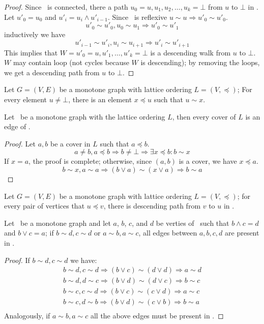 \begin{proof}
Since \mG\ is connected, there a path \(u_0=u,u_1,u_2,\dotsc,u_k=\bot\) from \(u\) to 
\(\bot\) in \mG\@. Let \(u'_0=u_0\) and \(u'_i = u_i\wedge u'_{i-1}\)\@.
Since \mG\ is reflexive \(u\sim u \Rightarrow u'_0\sim u'_0\)\@.
\[u'_0\sim u'_0, u_0\sim u_1 \Rightarrow u'_0\sim u'_1\]
inductively we have
\[u'_{i-1}\sim u'_i, u_i\sim u_{i+1} \Rightarrow u'_i\sim u'_{i+1} \]
This implies that \(W=u'_0=u,u'_1,\dotsc,u'_k=\bot\) is a descending walk from 
\(u\) to \(\bot\)\@. \(W\) may contain loop (not cycles because \(W\) is descending);
by removing the loops, we get a descending path from \(u\) to \(\bot\)\@.
\end{proof}

\begin{cor}
Let \(G=(V,E)\) be a monotone graph with lattice ordering \(L=(V,\preceq)\); 
For every element \(u \neq \bot\),
there is an element \(x \preceq u\) such that \(u\sim x\)\@.
\end{cor}

\begin{lemma}
Let \mG\ be a monotone graph with the lattice ordering \(L\), then every cover
of \(L\) is an edge of \mG\@.
\end{lemma}

\begin{proof}
Let \(a,b\) be a cover in \(L\) such that \(a \preceq b\)\@.
\[a \neq b, a \preceq b \Rightarrow b\neq \bot \Rightarrow \exists x \preceq b: b\sim x\]
If \(x=a\), the proof is complete; otherwise, since \((a,b)\) is a cover, we have \(x\preceq a\).
\[b\sim x,a\sim a \Rightarrow (b \vee a) \sim (x \vee a) \Rightarrow b\sim a\]\@
\end{proof}

\begin{cor}
Let \(G=(V,E)\) be a monotone graph with lattice ordering \(L=(V, \preceq)\);
for every pair of vertices that \(u\preceq v\), there is descending path from
\(v\) to \(u\) in \mG\@. 
\end{cor}

\begin{lemma}
Let \mG\ be a monotone graph and let
\(a\), \(b\), \(c\), and \(d\) be verties of \mG\ such that \(b \wedge c = d\) and \(b \vee c = a\);
if \(b\sim d, c\sim d\) or \(a\sim b, a\sim c\), all edges between 
\(a, b, c, d\) are present in \mG\@.
\end{lemma}

\begin{proof}
If \(b\sim d, c\sim d\) we have:
\begin{eqnarray*}
b\sim d, c\sim d \Rightarrow (b \vee c) \sim (d \vee d) \Rightarrow a\sim d\\
b\sim d, d\sim c \Rightarrow (b \vee d) \sim (d \vee c) \Rightarrow b\sim c\\
b\sim c, c\sim d \Rightarrow (b \vee c) \sim (c \vee d) \Rightarrow a\sim c\\
b\sim c, d\sim b \Rightarrow (b \vee d) \sim (c \vee b) \Rightarrow b\sim a\\
\end{eqnarray*}
Analogously, if \(a\sim b, a\sim c\) all the above edges must be present in \mG\@.
\end{proof}

